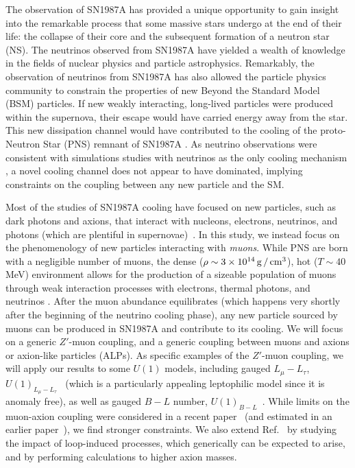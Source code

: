\documentclass[11pt]{article}
\newcommand{\tenx}[1]{\times 10^{#1}}
\begin{document}
The observation of SN1987A has provided a unique opportunity to gain insight into the remarkable process that some massive stars undergo at the end of their life: the collapse of their core and the subsequent formation of a neutron star (NS). The neutrinos observed from SN1987A have yielded a wealth of knowledge in the fields of nuclear physics and particle astrophysics. Remarkably, the observation of neutrinos from SN1987A has also allowed the particle physics community to constrain the properties of new Beyond the Standard Model (BSM) particles. If new weakly interacting, long-lived particles were produced within the supernova, their escape would have carried energy away from the star. This new dissipation channel would have contributed to the cooling of the proto-Neutron Star (PNS) remnant of SN1987A \cite{Raffelt:1996wa}.  
As neutrino observations were consistent with simulations studies with neutrinos as the only cooling mechanism \cite{Burrows:1986me,Burrows:1987zz}, a novel cooling channel does not appear to have dominated, implying constraints on the coupling between any new particle and the SM.


Most of the studies of SN1987A cooling have focused on new particles, such as dark photons and axions, that interact with nucleons, electrons, neutrinos, and photons (which are plentiful in supernovae)~\cite{Burrows:1987zz, Burrows:1990pk, Kainulainen:1990bn, Raffelt:1996wa, Hanhart:2000er, Hanhart:2001fx, Dreiner:2003wh, Rrapaj:2015wgs, Chang:2016ntp, Chang:2018rso, Lee:2018lcj, DeRocco:2019njg, DeRocco:2019jti, Ertas:2020xcc}. In this study, we instead focus on the phenomenology of new particles interacting with \textit{muons}. While PNS are born with a negligible number of muons, the dense ($\rho \sim 3\tenx{14} \g/\cm^3$), hot ($T \sim 40$ MeV) environment allows for the production of a sizeable population of muons through weak interaction processes with electrons, thermal photons, and neutrinos \cite{Bollig:2017lki}. After the muon abundance equilibrates (which happens very shortly after the beginning of the neutrino cooling phase), any new particle sourced by muons can be produced in SN1987A and contribute to its cooling.
%
We will focus on a generic $Z'$-muon coupling, and a generic coupling between muons and axions or axion-like particles (ALPs). As specific examples of the $Z'$-muon coupling, we will apply our results to some $U(1)$ models, including gauged $L_\mu-L_\tau$, $U(1)_{L_\mu-L_\tau}$~\cite{Foot:1990mn,He:1990pn,He:1991qd} (which is a particularly appealing leptophilic model since it is anomaly free), as well as gauged $B-L$ number, $U(1)_{B-L}$~\cite{PhysRevD.20.776,PhysRevLett441316, WETTERICH1981343, BUCHMULLER1991395}. While limits on the muon-axion coupling were considered in a recent paper~\cite{Bollig:2020xdr, Calibbi:2020jvd} (and estimated in an earlier paper~\cite{Brust:2013ova}), we find stronger constraints. We also extend Ref.~\cite{Bollig:2020xdr, Calibbi:2020jvd} by studying the impact of loop-induced processes, which generically can be expected to arise, and by performing calculations to higher axion masses. 
\end{document}
